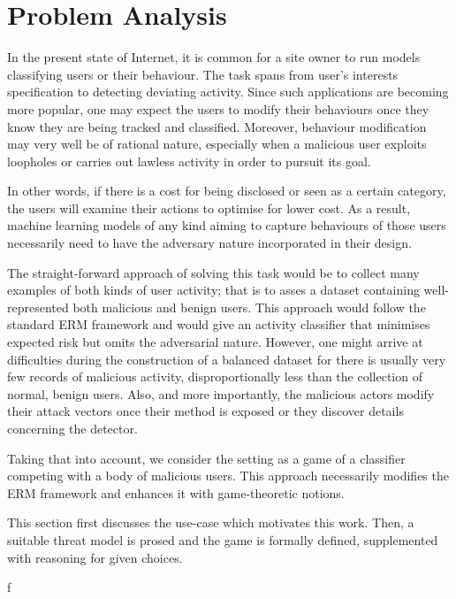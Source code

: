 \section{Problem Analysis}


In the present state of Internet, it is common for a site owner to run
models classifying users or their behaviour. The task spans from user’s
interests specification to detecting deviating activity. Since such
applications are becoming more popular, one may expect the users to
modify their behaviours once they know they are being tracked and
classified. Moreover, behaviour modification may very well be of
rational nature, especially when a malicious user exploits loopholes or
carries out lawless activity in order to pursuit its goal.

In other words, if there is a cost for being disclosed or seen as a
certain category, the users will examine their actions to optimise for
lower cost. As a result, machine learning models of any kind aiming to
capture behaviours of those users necessarily need to have the adversary
nature incorporated in their design.

The straight-forward approach of solving this task would be to collect
many examples of both kinds of user activity; that is to asses a dataset
containing well-represented both malicious and benign users. This
approach would follow the standard ERM framework and would give an
activity classifier that minimises expected risk but omits the
adversarial nature. However, one might arrive at difficulties during the
construction of a balanced dataset for there is usually very few records
of malicious activity, disproportionally less than the collection of
normal, benign users. Also, and more importantly, the malicious actors
modify their attack vectors once their method is exposed or they
discover details concerning the detector.

Taking that into account, we consider the setting as a game of a classifier
competing with a body of malicious users. This approach necessarily
modifies the ERM framework and enhances it with game-theoretic notions.

This section first discusses the use-case which motivates this work.
Then, a suitable threat model is prosed and the game is formally
defined, supplemented with reasoning for given choices.

f


